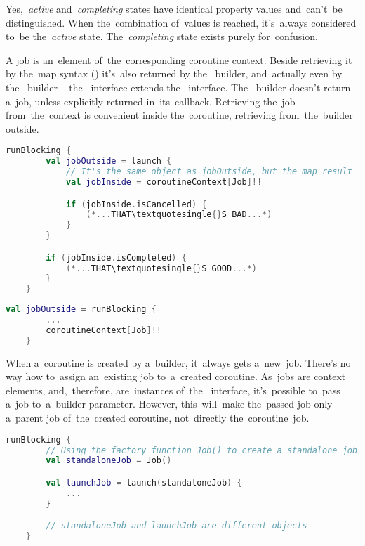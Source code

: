 \notenonl Yes,~\textit{active} and~\textit{completing} states have identical property values and~can't~be distinguished.
When the~combination of~values is reached, it's~always considered to~be the~\textit{active} state.
The~\textit{completing} state exists purely for~confusion.
\newline

\noindent A job is an~element of~the~corresponding \hyperref[kotlincoroutinecontext]{coroutine context}.
Beside retrieving it by the~map syntax () it's~also returned by the~\hyperref[kotlincoroutinelaunch]{} builder, and~actually even by the~\hyperref[kotlincoroutineasync]{} builder -- the~ interface extends the~ interface.
\mbox{The \hyperref[kotlincoroutinerunblocking]{}} builder doesn't return a~job, unless explicitly returned in~its~callback.
Retrieving the~job from~the~context is convenient inside the~coroutine, retrieving from~the~builder outside.

\begin{lstlisting}[language=Kotlin]
    runBlocking {
        val jobOutside = launch {
            // It's the same object as jobOutside, but the map result is nullable
            val jobInside = coroutineContext[Job]!!

            if (jobInside.isCancelled) {
                (*...THAT\textquotesingle{}S BAD...*)
            }
        }

        if (jobInside.isCompleted) {
            (*...THAT\textquotesingle{}S GOOD...*)
        }
    }
\end{lstlisting}

\begin{lstlisting}[language=Kotlin]
    val jobOutside = runBlocking {
        ...
        coroutineContext[Job]!!
    }
\end{lstlisting}

\warning When a~coroutine is created by a~builder, it~always gets a~new~job.
There's no way how to~assign an~existing job to~a~created coroutine.
As~jobs are context elements, and,~therefore, are~instances of~the~ interface, it's~possible to~pass a~job to~a~builder parameter.
However, this~will~make the~passed job only a~parent job of~the~created coroutine, not~directly the~coroutine~job.

\begin{lstlisting}[language=Kotlin]
    runBlocking {
        // Using the factory function Job() to create a standalone job
        val standaloneJob = Job()

        val launchJob = launch(standaloneJob) {
            ...
        }

        // standaloneJob and launchJob are different objects
    }
\end{lstlisting}

